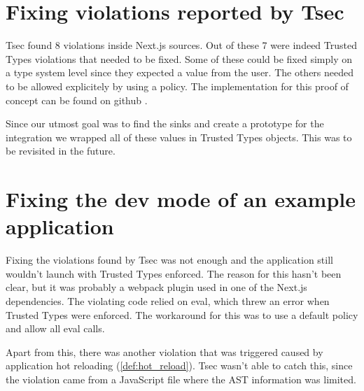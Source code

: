 \section{Fixing violations reported by Tsec}

Tsec found 8 violations \cite{tsec_output} inside Next.js sources. Out of these 7 were indeed
Trusted Types violations that needed to be fixed. Some of these could be fixed simply on a type
system level since they expected a value from the user. The others needed to be allowed explicitely
by using a policy. The implementation for this proof of concept can be found on github
\cite{nextjs_fix_tsec_violations_commit}.

Since our utmost goal was to find the sinks and create a prototype for the integration we wrapped
all of these values in Trusted Types objects. This was to be revisited in the future.

\section{Fixing the dev mode of an example application}

Fixing the violations found by Tsec was not enough and the application still wouldn't launch with
Trusted Types enforced. The reason for this hasn't been clear, but it was probably a webpack plugin
used in one of the Next.js dependencies. The violating code relied on eval, which threw an error
when Trusted Types were enforced. The workaround for this was to use a default policy and allow all
eval calls.

Apart from this, there was another violation that was triggered caused by application hot reloading
(\ref{def:hot_reload}). Tsec wasn't able to catch this, since the violation came from a JavaScript
file where the AST information was limited.
